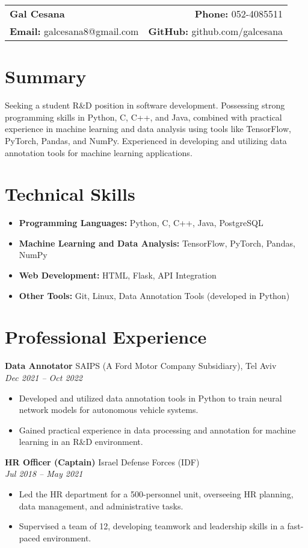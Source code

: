 \documentclass[a4paper,10pt]{article}
\makeatletter
\renewcommand{\maketitle}{
    \hspace{-1em}\begin{tabular*}{\textwidth}{l@{\extracolsep{\fill}}r}
        \textbf{\LARGE Gal Cesana} & \textbf{Phone:} 052-4085511 \\
        \textbf{Email:} galcesana8@gmail.com & \textbf{GitHub:} github.com/galcesana \\
    \end{tabular*}
    \vspace{1em}
}
\makeatother
\begin{document}
\maketitle

\section*{Summary}
Seeking a student R\&D position in software development. Possessing strong programming skills in Python, C, C++, and Java, combined with practical experience in machine learning and data analysis using tools like TensorFlow, PyTorch, Pandas, and NumPy.  Experienced in developing and utilizing data annotation tools for machine learning applications.

\section*{Technical Skills}
\begin{itemize}[noitemsep,nolistsep]
    \item \textbf{Programming Languages:} Python, C, C++, Java, PostgreSQL
    \item \textbf{Machine Learning and Data Analysis:} TensorFlow, PyTorch, Pandas, NumPy
    \item \textbf{Web Development:} HTML, Flask, API Integration
    \item \textbf{Other Tools:} Git, Linux, Data Annotation Tools (developed in Python)
\end{itemize}


\section*{Professional Experience}
\textbf{Data Annotator} \hfill SAIPS (A Ford Motor Company Subsidiary), Tel Aviv \\
\textit{Dec 2021 -- Oct 2022}
\begin{itemize}[noitemsep,nolistsep]
    \item Developed and utilized data annotation tools in Python to train neural network models for autonomous vehicle systems.
    \item Gained practical experience in data processing and annotation for machine learning in an R\&D environment.
\end{itemize}


\textbf{HR Officer (Captain)} \hfill Israel Defense Forces (IDF) \\
\textit{Jul 2018 -- May 2021}
\begin{itemize}[noitemsep,nolistsep]
    \item Led the HR department for a 500-personnel unit, overseeing HR planning, data management, and administrative tasks.
    \item Supervised a team of 12, developing teamwork and leadership skills in a fast-paced environment.
\end{itemize}
\end{document}
